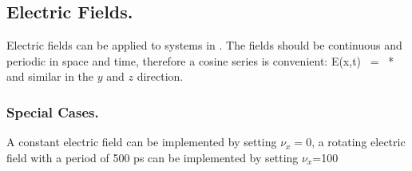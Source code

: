 




\subsection{Electric Fields.}
Electric fields can be applied to systems in {\gromacs}. The fields should
be continuous and
periodic in space and time, therefore a cosine series is convenient:
\beq
E(x,t)	~=~	\left[ \sum_{m=0}^{Mx}~\cos\left( 2\pi m \nu_x t - \phi_x\right)\right] * \left[ \sum_{n=0}^{Nx}~a_n \cos\left( 2\pi \frac{n x}{L_x}\right) \right]
\eeq
and similar in the $y$ and $z$ direction.

\subsubsection{Special Cases.}
A constant electric field can be implemented by setting $\nu_x = 0$,
a rotating electric field with a period of 500 ps
can be implemented by setting  $\nu_x$=100




